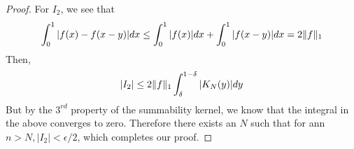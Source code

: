 \begin{proof}
    For $I_2$, we see that 
    \begin{displaymath}
      \int_0^1 |f(x) - f(x-y)|dx \le \int_0^1 |f(x)| dx + \int_0^1 |f(x-y)| dx = 2\lVert f\rVert_1
    \end{displaymath}
  Then,
  \begin{displaymath}
    |I_2| \le 2\lVert f\rVert_1 \int_{\delta}^{1-\delta} |K_N(y)|dy
  \end{displaymath}
But by the $3^{rd}$ property of the summability kernel, we know that the integral in the above converges to zero. Therefore there exists an $N$ such that for ann $n>N, |I_2|< \epsilon/2$, which completes our proof.
  \end{proof}
